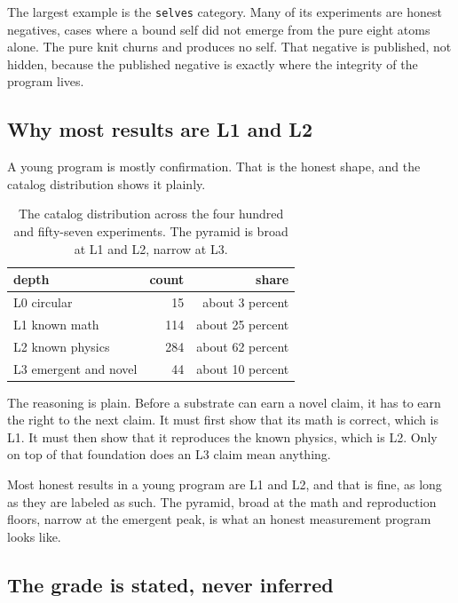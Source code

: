 The largest example is the \texttt{selves} category. Many of its experiments are honest negatives, cases where a bound self did not emerge from the pure eight atoms alone. The pure knit churns and produces no self. That negative is published, not hidden, because the published negative is exactly where the integrity of the program lives.

\subsection{Why most results are L1 and L2}

A young program is mostly confirmation. That is the honest shape, and the catalog distribution shows it plainly.

\begin{table}[ht]
\centering
\begin{tabular}{@{}lrr@{}}
\toprule
depth & count & share \\
\midrule
L0 circular & 15 & about 3 percent \\
L1 known math & 114 & about 25 percent \\
L2 known physics & 284 & about 62 percent \\
L3 emergent and novel & 44 & about 10 percent \\
\bottomrule
\end{tabular}
\caption{The catalog distribution across the four hundred and fifty-seven experiments. The pyramid is broad at L1 and L2, narrow at L3.}
\label{tab:depth-distribution}
\end{table}

The reasoning is plain. Before a substrate can earn a novel claim, it has to earn the right to the next claim. It must first show that its math is correct, which is L1. It must then show that it reproduces the known physics, which is L2. Only on top of that foundation does an L3 claim mean anything.

\begin{principle}
Most honest results in a young program are L1 and L2, and that is fine, as long as they are labeled as such. The pyramid, broad at the math and reproduction floors, narrow at the emergent peak, is what an honest measurement program looks like.
\end{principle}

\subsection{The grade is stated, never inferred}

